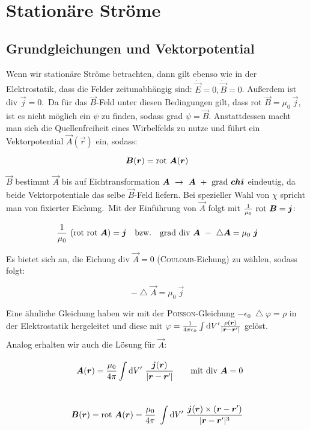 \chapter{Stationäre Ströme}

\section{Grundgleichungen und Vektorpotential}

Wenn wir stationäre Ströme betrachten, dann gilt ebenso wie in der Elektrostatik, dass die Felder zeitunabhängig sind: $\dot{\vec{E}} = 0, \dot{\vec{B}}=0$. Außerdem ist div $\vec{j} = 0$.\
Da für das $\vec{B}$-Feld unter diesen Bedingungen gilt, dass rot $\vec{B} = \mu_0 \ \vec{j}$, ist es nicht möglich ein $\psi$ zu finden, sodass grad $\psi = \vec{B}$. Anstattdessen macht man sich die Quellenfreiheit eines Wirbelfelds zu nutze und führt ein Vektorpotential $\vec{A}(\vec{r})$ ein, sodass:

\begin{equation*}
\bm{B}(\bm{r}) = \text{rot } \bm{A}(\bm{r})
\end{equation*}

$\vec{B}$ bestimmt $\vec{A}$ bis auf Eichtransformation $\vec{A}\ \rightarrow \ \vec{A} \ + \ \grad \vec{chi}$ eindeutig, da beide Vektorpotentiale das selbe $\vec{B}$-Feld liefern. Bei spezieller Wahl von $\chi$ spricht man von fixierter Eichung.\
Mit der Einführung von $\vec{A}$ folgt mit $\frac{1}{\mu_0}\ \text{rot } \bm{B} = \bm{j}$:

\begin{equation*}
\frac{1}{\mu_0}\ (\rot\rot\vec{A})=\vec{j} \quad \text{bzw.} \quad \grad\div \vec{A}\ - \ \bigtriangleup\vec{A}=\mu_0 \ \vec{j}
\end{equation*}

Es bietet sich an, die Eichung div $\vec{A} = 0$ (\textsc{Coulomb}-Eichung) zu wählen, sodass folgt:

\begin{equation*}
-\bigtriangleup\vec{A}=\mu_0 \ \vec{j}
\end{equation*}

Eine ähnliche Gleichung haben wir mit der \textsc{Poisson}-Gleichung $-\epsilon_0 \ \bigtriangleup\varphi = \rho$ in der Elektrostatik hergeleitet und diese mit $\varphi = \frac{1}{4\pi\epsilon_0}\int\limits_{{}}^{{}}\mathrm{d}{V'}\frac{\rho(\bm{r})}{|\bm{r}-\bm{r}'|}$ gelöst.\ \\
Analog erhalten wir auch die Lösung für $\vec{A}$:

\begin{align*}
\vec{A}(\vec{r}) = \frac{\mu_0}{4\pi}\Int{}{}{V'} \ \frac{\vec{j}(\vec{r})}{|\vec{r}-\vec{r}'|} \qquad \text{mit div }\vec{A} = 0 \\
\ \\
\vec{B}(\vec{r}) = \rot \vec{A}(\vec{r}) = \frac{\mu_0}{4\pi}\ \Int {}{}{V'} \ \frac{\vec{j}(\vec{r})\times (\vec{r}-\vec{r}')}{|\vec{r}-\vec{r}'|^3}
\end{align*}

